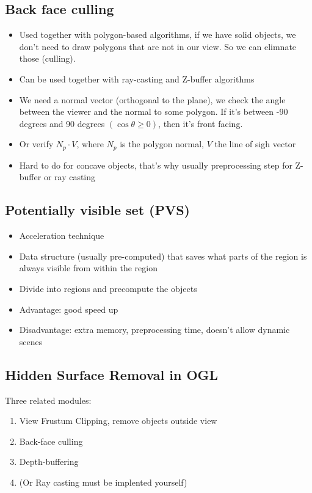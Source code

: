 \documentclass[11pt]{article}
\begin{document}
\subsection{Back face culling}
\begin{itemize}
    \item Used together with polygon-based algorithms, if we have solid objects, we don't need to draw polygons that are not in our view. So we can elimnate those (culling). 
    \item Can be used together with ray-casting and Z-buffer algorithms
    \item We need a normal vector (orthogonal to the plane), we check the angle between the viewer and the normal to some polygon. If it's between -90 degrees and 90 degrees $(\cos \theta \geq 0)$, then it's front facing.
    \item Or verify $N_p \cdot V$, where $N_p$ is the polygon normal, $V$ the line of sigh vector
    \item Hard to do for concave objects, that's why usually preprocessing step for Z-buffer or ray casting    
\end{itemize}

\subsection{Potentially visible set (PVS)}
\begin{itemize}
    \item Acceleration technique
    \item Data structure (usually pre-computed) that saves what parts of the region is always visible from within the region
    \item Divide into regions and precompute the objects
    \item Advantage: good speed up
    \item Disadvantage: extra memory, preprocessing time, doesn't allow dynamic scenes
\end{itemize}


\subsection{Hidden Surface Removal in OGL}
Three related modules:
\begin{enumerate}
    \item View Frustum Clipping, remove objects outside view
    \item Back-face culling
    \item Depth-buffering
    \item (Or Ray casting must be implented yourself)
\end{enumerate}
\end{document}
